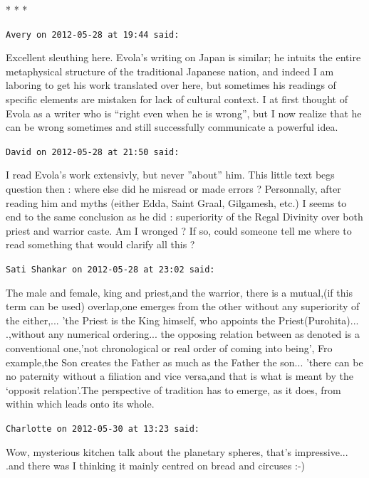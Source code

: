
\begin{center}* * *\end{center}

\begin{footnotesize}
\begin{sffamily}
\texttt{Avery on 2012-05-28 at 19:44 said:}

Excellent sleuthing here. Evola's writing on Japan is similar; he intuits the entire metaphysical structure of the traditional Japanese nation, and indeed I am laboring to get his work translated over here, but sometimes his readings of specific elements are mistaken for lack of cultural context. I at first thought of Evola as a writer who is ``right even when he is wrong'', but I now realize that he can be wrong sometimes and still successfully communicate a powerful idea.

\hfill

\texttt{David on 2012-05-28 at 21:50 said:}

I read Evola's work extensivly, but never ''about'' him. This little text begs question then : where else did he misread or made errors ? Personnally, after reading him and myths (either Edda, Saint Graal, Gilgamesh, etc.) I seems to end to the same conclusion as he did : superiority of the Regal Divinity over both priest and warrior caste. Am I wronged ? If so, could someone tell me where to read something that would clarify all this ?

\hfill

\texttt{Sati Shankar on 2012-05-28 at 23:02 said:}

The male and female, king and priest,and the warrior, there is a mutual,(if this term can be used) overlap,one emerges from the other without any superiority of the either,... 'the Priest is the King himself, who appoints the Priest(Purohita)... .,without any numerical ordering... the opposing relation between as denoted is a conventional one,'not chronological or real order of coming into being', Fro example,the Son creates the Father as much as the Father the son... 'there can be no paternity without a filiation and vice versa,and that is what is meant by the `opposit relation'.The perspective of tradition has to emerge, as it does, from within which leads onto its whole.

\hfill

\texttt{Charlotte on 2012-05-30 at 13:23 said:}

Wow, mysterious kitchen talk about the planetary spheres, that's impressive... .and there was I thinking it mainly centred on bread and circuses :-)


\end{sffamily}
\end{footnotesize}
